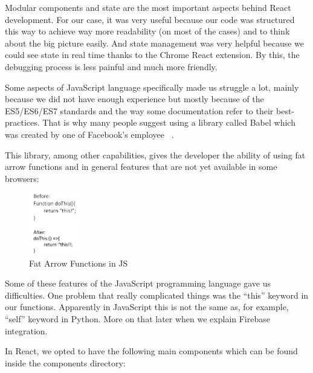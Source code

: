 Modular components and state are the most important aspects behind React development. For our case, it was very useful because our code was structured this way to achieve way more readability (on most of the cases) and to think about the big picture easily. And state management was very helpful because we could see state in real time thanks to the Chrome React extension. By this, the debugging process is less painful and much more friendly.

Some aspects of JavaScript language specifically made us struggle a lot, mainly because we did not have enough experience but mostly because of the ES5/ES6/ES7 standards and the way some documentation refer to their best-practices. That is why many people suggest using a library called Babel which was created by one of Facebook's employee ~\cite{4646eyyeye}.

This library, among other capabilities, gives the developer the ability of using fat arrow functions and in general features that are not yet available in some browsers:

\begin{figure}[ht]
\centering
\includegraphics[width=0.2\textwidth]{figs/before}
	\caption{Fat Arrow Functions in JS}
	\label{fig:before}
\end{figure}

Some of these features of the JavaScript programming language gave us difficulties. One problem that really complicated things was the “this” keyword in our functions. Apparently in JavaScript this is not the same as, for example, “self” keyword in Python. More on that later when we explain Firebase integration.

In React, we opted to have the following main components which can be found inside the components directory:



